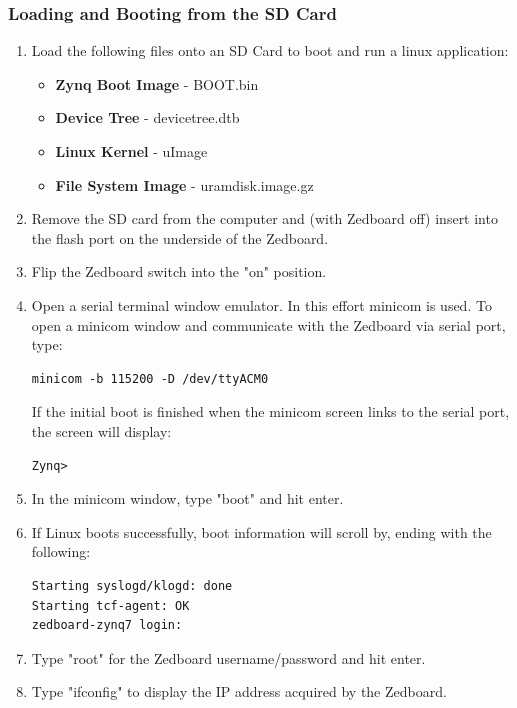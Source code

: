 \documentclass[12pt]{article}
\begin{document}
\subsubsection{Loading and Booting from the SD Card}\label{subsubsec:SD}
\begin{enumerate} 
\item Load the following files onto an SD Card to boot and run a linux application:
\begin{itemize}
\item \textbf{Zynq Boot Image} - BOOT.bin
\item \textbf{Device Tree} - devicetree.dtb
\item \textbf{Linux Kernel} - uImage
\item \textbf{File System Image} - uramdisk.image.gz
\end{itemize}
\item Remove the SD card from the computer and (with Zedboard off) insert into the flash port on the underside of the Zedboard.
\item Flip the Zedboard switch into the "on" position.
\item Open a serial terminal window emulator.  In this effort minicom is used.  To open a minicom window and communicate with the Zedboard via serial port, type: \label{itm:minicom}
\begin{lstlisting}
minicom -b 115200 -D /dev/ttyACM0
\end{lstlisting}
If the initial boot is finished when the minicom screen links to the serial port, the screen will display:
\begin{lstlisting}
Zynq>
\end{lstlisting}
\item In the minicom window, type "boot" and hit enter.
\item If Linux boots successfully, boot information will scroll by, ending with the following:
\begin{lstlisting}
Starting syslogd/klogd: done                                                    
Starting tcf-agent: OK                                                          
zedboard-zynq7 login:
\end{lstlisting}
\item Type "root" for the Zedboard username/password and hit enter.
\item Type "ifconfig" to display the IP address acquired by the Zedboard.
\end{enumerate}
\end{document}
